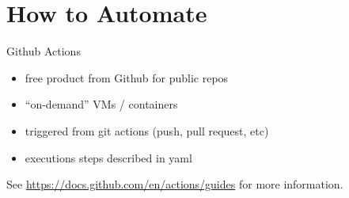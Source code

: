 \documentclass{beamer}
\begin{document}
\section{How to Automate}

\begin{frame}{Github Actions}
    \begin{itemize}
        \item free product from Github for public repos
        \item ``on-demand'' VMs / containers
        \item triggered from git actions (push, pull request, etc)
        \item executions steps described in yaml
    \end{itemize}

    See \url{https://docs.github.com/en/actions/guides} for more information.
\end{frame}
\end{document}
